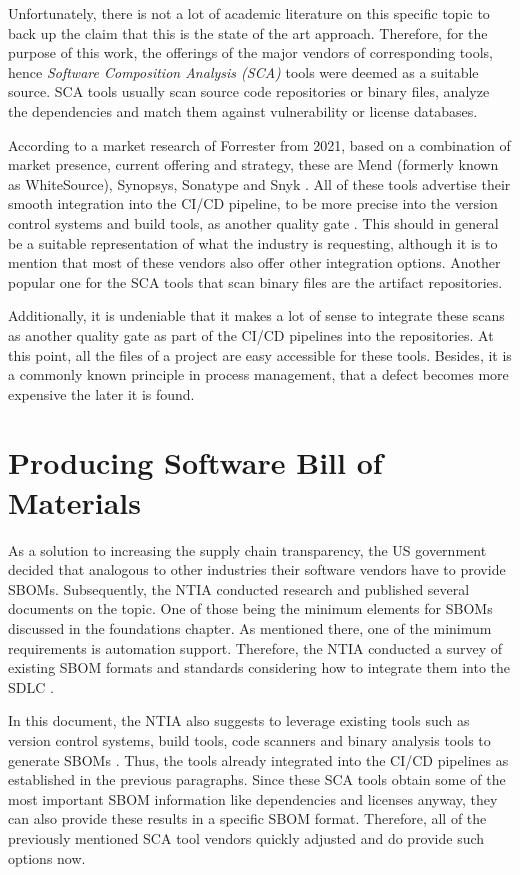 Unfortunately, there is not a lot of academic literature on this specific topic to back up the claim that this is the state of the art approach. Therefore, for the purpose of this work, the offerings of the major vendors of corresponding tools, hence \emph{Software Composition Analysis (SCA)} tools were deemed as a suitable source. SCA tools usually scan source code repositories or binary files, analyze the dependencies and match them against vulnerability or license databases.\par
According to a market research of Forrester from 2021, based on a combination of market presence, current offering and strategy, these are Mend (formerly known as WhiteSource), Synopsys, Sonatype and Snyk \cite{ForresterSCA}. All of these tools advertise their smooth integration into the CI/CD pipeline, to be more precise into the version control systems and build tools, as another quality gate \cite{MendIntegration, BDBAIntegration, SonatypeIntegration, SnykIntegration}. This should in general be a suitable representation of what the industry is requesting, although it is to mention that most of these vendors also offer other integration options. Another popular one for the SCA tools that scan binary files are the artifact repositories.\par 
Additionally, it is undeniable that it makes a lot of sense to integrate these scans as another quality gate as part of the CI/CD pipelines into the repositories. At this point, all the files of a project are easy accessible for these tools. Besides, it is a commonly known principle in process management, that a defect becomes more expensive the later it is found.\par 
 
\section{Producing Software Bill of Materials}
As a solution to increasing the supply chain transparency, the US government decided that analogous to other industries their software vendors have to provide SBOMs. Subsequently, the NTIA conducted research and published several documents on the topic. One of those being the minimum elements for SBOMs discussed in the foundations chapter. As mentioned there, one of the minimum requirements is automation support. Therefore, the NTIA conducted a survey of existing SBOM formats and standards considering how to integrate them into the SDLC \cite{SBOMSurvey}.\par
In this document, the NTIA also suggests to leverage existing tools such as version control systems, build tools, code scanners and binary analysis tools to generate SBOMs \cite{SBOMSurvey}. Thus, the tools already integrated into the CI/CD pipelines as established in the previous paragraphs. Since these SCA tools obtain some of the most important SBOM information like dependencies and licenses anyway, they can also provide these results in a specific SBOM format. Therefore, all of the previously mentioned SCA tool vendors quickly adjusted and do provide such options now.

